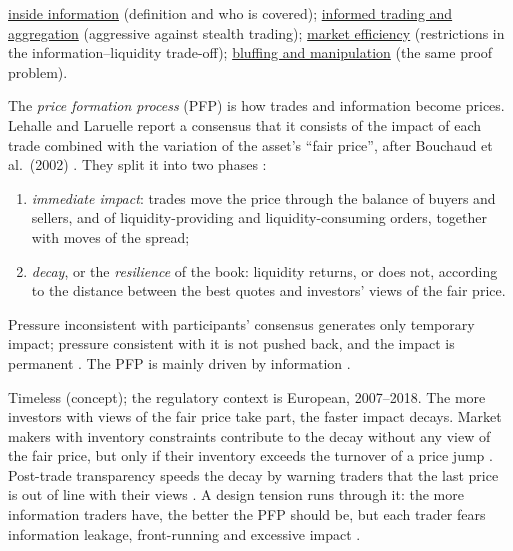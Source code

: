 \begin{qfresult}
 \hyperref[def:inside-information]{inside information} (definition and who is covered); \hyperref[res:informed-trading-aggregation]{informed trading and aggregation} (aggressive against stealth trading); \hyperref[def:market-efficiency]{market efficiency} (restrictions in the information--liquidity trade-off); \hyperref[def:bluffing-manipulation]{bluffing and manipulation} (the same proof problem).

\end{qfresult}

\begin{qfdefinition}\label{def:price-formation-process}
 The \emph{price formation process} (PFP) is how trades and information become prices. Lehalle and Laruelle report a consensus that it consists of the impact of each trade combined with the variation of the asset's ``fair price'', after Bouchaud et al.\ (2002) \citep[Introduction, p.~27]{alpha-laruelle}. They split it into two phases \citep[same, Figure~8, pp.~27--29]{alpha-laruelle}:
\begin{enumerate}
\item \emph{immediate impact}: trades move the price through the balance of buyers and sellers, and of liquidity-providing and liquidity-consuming orders, together with moves of the spread;
\item \emph{decay}, or the \emph{resilience} of the book: liquidity returns, or does not, according to the distance between the best quotes and investors' views of the fair price.
\end{enumerate}
Pressure inconsistent with participants' consensus generates only temporary impact; pressure consistent with it is not pushed back, and the impact is permanent \citep[same, pp.~3 and~28]{alpha-laruelle}. The PFP is mainly driven by information \citep[same, p.~7]{alpha-laruelle}.

 Timeless (concept); the regulatory context is European, 2007--2018. The more investors with views of the fair price take part, the faster impact decays. Market makers with inventory constraints contribute to the decay without any view of the fair price, but only if their inventory exceeds the turnover of a price jump \citep[Introduction, p.~28]{alpha-laruelle}. Post-trade transparency speeds the decay by warning traders that the last price is out of line with their views \citep[same, p.~28]{alpha-laruelle}. A design tension runs through it: the more information traders have, the better the PFP should be, but each trader fears information leakage, front-running and excessive impact \citep[same, pp.~19--20]{alpha-laruelle}.


\end{qfdefinition}
